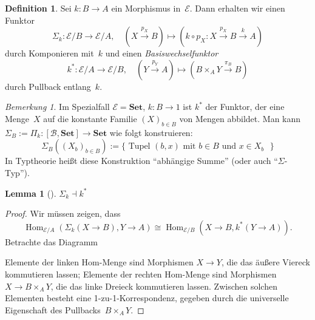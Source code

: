 \documentclass{article}
\theoremstyle{definition}
\newtheorem*{defn}{Definition}
\newtheorem*{lem}{Lemma}
\theoremstyle{remark}
\newtheorem*{bem}{Bemerkung}
\newcommand{\coloneqq}{:=} %
\newcommand{\?}{\,{:}\,}
\renewcommand{\_}{\mathpunct{.}\,}
\DeclareMathOperator{\Hom}{Hom} %
\newcommand{\ladj}{\dashv} %
\newcommand{\SetC}{\mathbf{Set}} %
\newcommand{\FuncC}[2]{[{#1}, {#2}]} %
\newcommand{\Bat}{\mathcal{B}} %
\newcommand{\Eat}{\mathcal{E}} %
\begin{document}
\begin{defn}
  Sei $k : B \to A$ ein Morphismus in~$\Eat$.
  Dann erhalten wir einen Funktor
  \[
    \Sigma_k : \Eat/B \to \Eat/A, \quad
    (X \xrightarrow{p_X} B) \mapsto (k \circ p_X : X \xrightarrow{p_X} B \xrightarrow{k} A)
  \]
  durch Komponieren mit~$k$ und einen \emph{Basiswechselfunktor}
  \[
    k^* : \Eat/A \to \Eat/B, \quad
    (Y \xrightarrow{p_Y} A) \mapsto (B \times_A Y \xrightarrow{\pi_B} B)
  \]
  durch Pullback entlang~$k$.
\end{defn}

\begin{bem}
  Im Spezialfall $\Eat = \SetC$, $k : B \to 1$ ist $k^*$ der Funktor, der eine Menge~$X$ auf die konstante Familie $(X)_{b \in B}$ von Mengen abbildet.
  Man kann $\Sigma_B \coloneqq \Pi_k : \FuncC{\Bat}{\SetC} \to \SetC$ wie folgt konstruieren:
  \[
    \Sigma_B((X_b)_{b \in B}) \coloneqq \{ \text{ Tupel $(b, x)$ mit $b \in B$ und $x \in X_b$ } \}
  \]
  In Typtheorie heißt diese Konstruktion "`abhängige Summe"' (oder auch "`$\Sigma$-Typ"').
\end{bem}

\begin{lem}[{\cite[I.9.4]{sigal}}]
  $\Sigma_k \ladj k^*$
\end{lem}

\begin{proof}
Wir müssen zeigen, dass
\[
  \Hom_{\Eat/A}(\Sigma_k(X \to B), Y \to A) \cong \Hom_{\Eat/B}(X \to B, k^*(Y \to A)).
\]
Betrachte das Diagramm
\begin{center}\end{center}
Elemente der linken Hom-Menge sind Morphismen $X \to Y$, die das äußere Viereck kommutieren lassen; Elemente der rechten Hom-Menge sind Morphismen $X \to B \times_A Y$, die das linke Dreieck kommutieren lassen.
Zwischen solchen Elementen besteht eine 1-zu-1-Korrespondenz, gegeben durch die universelle Eigenschaft des Pullbacks~$B \times_A Y$.
\end{proof}
\end{document}
